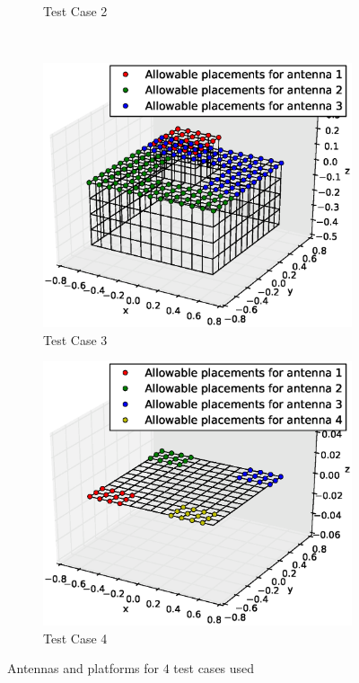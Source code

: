 \documentclass[conference]{IEEEtran}
\begin{document}
\begin{figure}
\begin{subfigure}{.5\columnwidth}
        \caption{Test Case 2}%
    \label{fig:tc2_figure}%
    \end{subfigure}\hfill\\%
    \begin{subfigure}{.5\columnwidth}
        \includegraphics[width=\columnwidth, height=\columnwidth]{FIG/tc_3_figure}%
        \caption{Test Case 3}%
    \label{fig:plat2}%
    \end{subfigure}\hfill%
    \begin{subfigure}{.5\columnwidth}
        \includegraphics[width=\columnwidth,height=\columnwidth]{FIG/tc_4_figure}%
        \caption{Test Case 4}%
        \label{fig:plat3}%
    \end{subfigure}\hfill
    \caption{Antennas and platforms for $4$ test cases used}
    \label{fig:tc_figures}
\end{figure}
\end{document}
